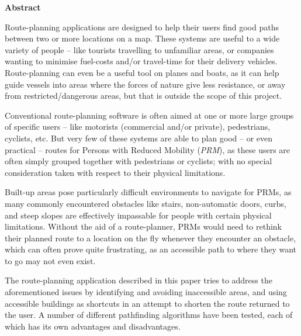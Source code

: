 \thispagestyle{empty}

\begin{center}
    {\LARGE\bf Abstract}
\end{center}





 Route-planning applications are designed to help their users find good paths between two or more locations on a map. These systems are useful to a wide variety of people -- like tourists travelling to unfamiliar areas, or companies wanting to minimise fuel-costs and/or travel-time for their delivery vehicles. Route-planning can even be a useful tool on planes and boats, as it can help guide vessels into areas where the forces of nature give less resistance, or away from restricted/dangerous areas, but that is outside the scope of this project.

Conventional route-planning software is often aimed at one or more large groups of specific users -- like motorists (commercial and/or private), pedestrians, cyclists, etc. But very few of these systems are able to plan good -- or even practical -- routes for Persons with Reduced Mobility (\textit{PRM}), as these users are often simply grouped together with pedestrians or cyclists; with no special consideration taken with respect to their physical limitations.

Built-up areas pose particularly difficult environments to navigate for PRMs, as many commonly encountered obstacles like stairs, non-automatic doors, curbs, and steep slopes are effectively impassable for people with certain physical limitations. Without the aid of a route-planner, PRMs would need to rethink their planned route to a location on the fly whenever they encounter an obstacle, which can often prove quite frustrating, as an accessible path to where they want to go may not even exist.

The route-planning application described in this paper tries to address the aforementioned issues by identifying and avoiding inaccessible areas, and using accessible buildings as shortcuts in an attempt to shorten the route returned to the user. A number of different pathfinding algorithms have been tested, each of which has its own advantages and disadvantages.
